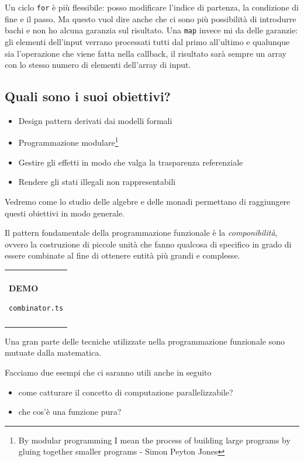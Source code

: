 \documentclass[12pt]{article}
\theoremstyle{definition}
\newenvironment{demo}
    {\begin{center}
    \begin{tabular}{|p{0.9\textwidth}|}
    \hline\\
    }
    {
    \\\\\hline
    \end{tabular}
    \end{center}
    }
\begin{document}
Un ciclo \texttt{for} è più flessibile: posso modificare l'indice di partenza, la condizione di fine e il passo.
Ma questo vuol dire anche che ci sono più possibilità di introdurre bachi e non ho alcuna garanzia sul risultato.
Una \texttt{map} invece mi da delle garanzie: gli elementi dell'input verrano processati tutti dal primo all'ultimo e
qualunque sia l'operazione che viene fatta nella callback, il risultato sarà sempre un array con lo stesso numero di elementi
dell'array di input.

\subsection{Quali sono i suoi obiettivi?}

\begin{itemize}
  \item Design pattern derivati dai modelli formali
  \item Programmazione modulare\footnote{By modular programming I mean the process of building large programs by gluing together smaller programs - Simon Peyton Jones}
  \item Gestire gli effetti in modo che valga la trasparenza referenziale
  \item Rendere gli stati illegali non rappresentabili
\end{itemize}

Vedremo come lo studio delle algebre e delle monadi permettano di raggiungere questi obiettivi in modo generale.

Il pattern fondamentale della programmazione funzionale è la \emph{componibilità}, ovvero la costruzione di piccole unità
che fanno qualcosa di specifico in grado di essere combinate al fine di ottenere entità più grandi e complesse.

\begin{demo}
\begin{center}
\textbf{DEMO}

\texttt{combinator.ts}
\end{center}
\end{demo}

Una gran parte delle tecniche utilizzate nella programmazione funzionale sono mutuate dalla matematica.

Facciamo due esempi che ci saranno utili anche in seguito

\begin{itemize}
  \item come catturare il concetto di computazione parallelizzabile?
  \item che cos'è una funzione pura?
\end{itemize}
\end{document}
